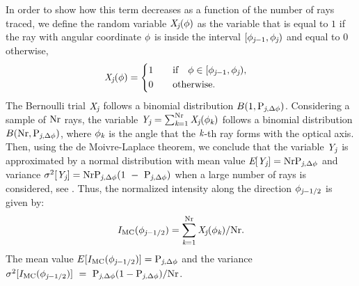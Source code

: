 In order to show how this term decreases as a function of the number of rays traced,
we define the random variable $\textit{X}_{\textit{j}}(\phi)$ as the variable that is equal to $1$ if the ray with angular coordinate $\phi$
is inside the interval $[\phi_{\textit{j}-1}, \phi_{\textit{j}})$ and equal to $0$ otherwise,
\begin{equation}
\label{radom_variable}
\textit{X}_{\textit{j}}(\phi) = \begin{cases} \begin{aligned}
1& \qquad \mbox{if} \quad \phi\in [\phi_{\textit{j}-1}, \phi_{\textit{j}}),\\
0 & \qquad \mbox{otherwise}.
\end{aligned}\end{cases}
\end{equation}
The Bernoulli trial $ \textit{X}_{\textit{j}}$ follows a binomial distribution $B(1,\textrm{P}_{\textit{j}, \Delta\phi})$.
Considering a sample of $\textrm{Nr}$ rays, the variable $\textit{Y}_{\textit{j}} = \sum_{\textit{k}=1}^{\textrm{Nr}} \textit{X}_{\textit{j}}(\phi_{\textit{k}})$
follows a binomial distribution $B(\textrm{Nr}, \textrm{P}_{\textit{j},\Delta \phi})$, where $\phi_{\textit{k}}$ is the angle that the $\textit{k}$-th ray forms
 with the optical axis. Then, using the de Moivre-Laplace theorem, we conclude that the variable $\textit{Y}_{\textit{j}}$ is approximated by a normal distribution with mean value 
$\textit{E}[\textit{Y}_{\textit{j}}] = \textrm{Nr}\textrm{P}_{\textit{j}, \Delta\phi}$ and variance $\sigma^2[\textit{Y}_{\textit{j}}] = \textrm{Nr}\textrm{P}_{\textit{j}, \Delta\phi}(1~-~\textrm{P}_{\textit{j}, \Delta\phi})$ 
when a large number of rays is considered, see \cite{zolotarev1997modern, rubinstein2016simulation}.
Thus, the normalized intensity along the direction $\phi_{\textit{j}-1/2}$ is given by:
\begin{equation}I_{\textrm{MC}}(\phi_{\textit{j}-1/2}) = \sum_{\textit{k}=1}^{\textrm{Nr}}\textit{X}_{\textit{j}}(\phi_{\textit{k}})/\textrm{Nr}.\end{equation}
The mean value $E[I_{\textrm{MC}}(\phi_{\textit{j}-1/2})]=\textrm{P}_{\textit{j}, \Delta\phi}$
and the variance $\sigma^2[I_{\textrm{MC}}(\phi_{\textit{j}-1/2})] ~=~ \textrm{P}_{\textit{j}, \Delta\phi}(1-\textrm{P}_{\textit{j}, \Delta\phi})/\textrm{Nr}$.
